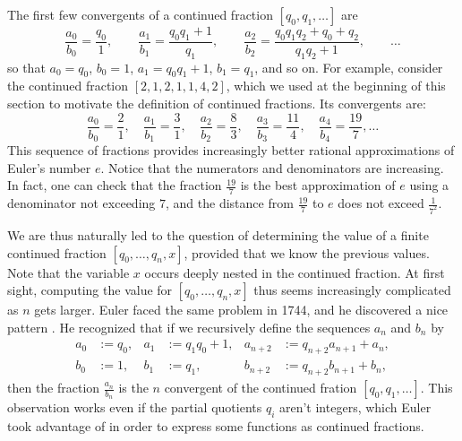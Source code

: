 The first few convergents of a continued fraction $[q_0,q_1,\ldots]$ are
\begin{equation*}
  \frac{a_0}{b_0} = \frac{q_0}{1},\qquad
  \frac{a_1}{b_1} = \frac{q_0q_1+1}{q_1},\qquad
  \frac{a_2}{b_2} = \frac{q_0q_1q_2+q_0+q_2}{q_1q_2+1},\qquad
  \ldots
\end{equation*}
so that $a_0=q_0$, $b_0=1$, $a_1=q_0q_1+1$, $b_1=q_1$, and so on.
For example, consider the continued fraction $[2,1,2,1,1,4,2]$, which we used at the beginning of this section to motivate the definition of continued fractions. Its convergents are:
\begin{equation*}
  \frac{a_0}{b_0}=\frac{2}{1},\quad
  \frac{a_1}{b_1}=\frac{3}{1},\quad
  \frac{a_2}{b_2}=\frac{8}{3},\quad
  \frac{a_3}{b_3}=\frac{11}{4},\quad
  \frac{a_4}{b_4}=\frac{19}{7},
  \ldots
\end{equation*}
This sequence of fractions provides increasingly better rational approximations of Euler's number $e$. Notice that the numerators and denominators are increasing. In fact, one can check that the fraction $\frac{19}{7}$ is the best approximation of $e$ using a denominator not exceeding $7$, and the distance from $\frac{19}{7}$ to $e$ does not exceed $\frac{1}{7^2}$.

We are thus naturally led to the question of determining the value of a finite continued fraction $[q_0,\ldots,q_n,x]$, provided that we know the previous values. Note that the variable $x$ occurs deeply nested in the continued fraction. At first sight, computing the value for $[q_0,\ldots,q_n,x]$ thus seems increasingly complicated as $n$ gets larger. Euler faced the same problem in 1744, and he discovered a nice pattern \cite[art.~7]{euler1744}. He recognized that if we recursively define the sequences $a_n$ and $b_n$ by
\begin{align*}
  a_0 & := q_0, & a_1 & := q_1q_0 + 1, & a_{n+2} & := q_{n+2}a_{n+1}+a_n, \\
  b_0 & := 1, & b_1 & := q_1, & b_{n+2} & := q_{n+2}b_{n+1}+b_n,
\end{align*}
then the fraction $\frac{a_n}{b_n}$ is the $n$\supth{} convergent of the continued fration $[q_0,q_1,\ldots]$. This observation works even if the partial quotients $q_i$ aren't integers, which Euler took advantage of in order to express some functions as continued fractions.

